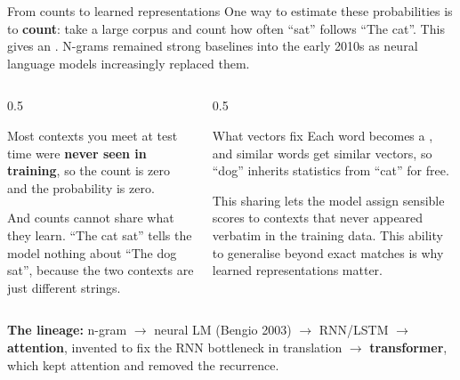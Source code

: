 \documentclass[aspectratio=169,10pt]{beamer}
\begin{document}
\begin{frame}[shrink=8]{From counts to learned representations}
  One way to estimate these probabilities is to \textbf{count}: take a large
  corpus and count how often ``sat'' follows ``The cat''. This gives an
  . N-grams remained strong baselines into the early 2010s
  as neural language models increasingly replaced them.

  \vspace{0.4em}
  \begin{columns}[T]
    \begin{column}{0.5\textwidth}
      \begin{gotcha}
        Most contexts you meet at test time were \textbf{never seen in
        training}, so the count is zero and the probability is zero.

        \vspace{0.3em}
        And counts cannot share what they learn. ``The cat sat'' tells the
        model nothing about ``The dog sat'', because the two contexts are
        just different strings.
      \end{gotcha}
    \end{column}
    \begin{column}{0.5\textwidth}
      \begin{block}{What vectors fix}
        \small
        Each word becomes a , and similar words get similar
        vectors, so ``dog'' inherits statistics from ``cat'' for free.

        \vspace{0.3em}
        This sharing lets the model assign sensible scores to contexts that
        never appeared verbatim in the training data. This ability to
        generalise beyond exact matches is why learned representations matter.
      \end{block}
    \end{column}
  \end{columns}

  \vfill
  \raggedright
  \footnotesize
  \textbf{The lineage:} n-gram $\to$ neural LM (Bengio 2003) $\to$ RNN/LSTM
  $\to$ \textbf{attention}, invented to fix the RNN bottleneck in translation
  $\to$ \textbf{transformer}, which kept attention and removed the recurrence.
\end{frame}
\end{document}
